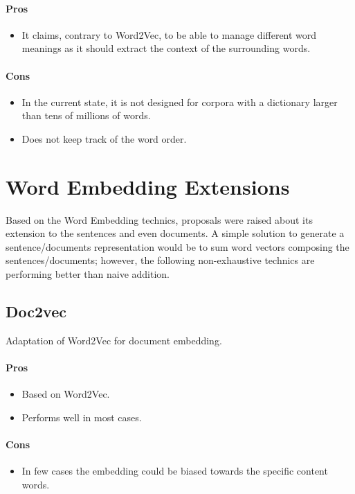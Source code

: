 \paragraph{Pros}
\begin{itemize}
    \setlength\itemsep{0em}
    \item It claims, contrary to Word2Vec, to be able to manage different word meanings as it should extract the context of the surrounding words.
\end{itemize}
\paragraph{Cons}
\begin{itemize}
    \setlength\itemsep{0em}
    \item In the current state, it is not designed for corpora with a dictionary larger than tens of millions of words.
    \item Does not keep track of the word order.
\end{itemize}


\section{Word Embedding Extensions}
Based on the Word Embedding technics, proposals were raised about its extension to the sentences and even documents. A simple solution to generate a sentence/documents representation would be to sum word vectors composing the sentences/documents; however, the following non-exhaustive technics are performing better than naive addition.

\subsection{Doc2vec\cite{article:doc2vec}}
Adaptation of Word2Vec for document embedding.
\paragraph{Pros}
\begin{itemize}
    \setlength\itemsep{0em}
    \item Based on Word2Vec.
    \item Performs well in most cases.
\end{itemize}
\paragraph{Cons}
\begin{itemize}
    \setlength\itemsep{0em}
    \item In few cases the embedding could be biased towards the specific content words.\cite{article:doc2vec_eval}
\end{itemize}

